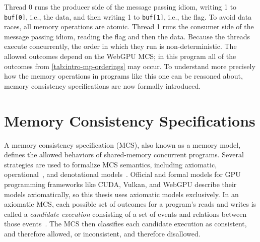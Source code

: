 Thread 0 runs the producer side of the message passing idiom, writing 1 to \texttt{buf[0]}, i.e., the data, and then writing 1 to \texttt{buf[1]}, i.e., the flag. To avoid data races, all memory operations are atomic. Thread 1 runs the consumer side of the message passing idiom, reading the flag and then the data. Because the threads execute concurrently, the order in which they run is non-deterministic. The allowed outcomes depend on the WebGPU MCS; in this program all of the outcomes from \mytab\ref{tab:intro-mp-orderings} may occur. To understand more precisely how the memory operations in programs like this one can be reasoned about, memory consistency specifications are now formally introduced.

\section{Memory Consistency Specifications}
\label{sec:bg-mcs}

A memory consistency specification (MCS), also known as a memory model, defines the allowed behaviors of shared-memory concurrent programs. Several strategies are used to formalize MCS semantics, including axiomatic, operational~\cite{colvin2018highleveloperationalsemanticshardware,nienhuis2016operational}, and denotational models~\cite{kavanagh2018denotationalaccountc11stylememory}. Official and formal models for GPU programming frameworks like CUDA, Vulkan, and WebGPU describe their models axiomatically, so this thesis uses axiomatic models exclusively. In an axiomatic MCS, each possible set of outcomes for a program's reads and writes is called a \textit{candidate execution} consisting of a set of events and relations between those events~\cite{alglave2014herding,batty2011mathematizing}. The MCS then classifies each candidate execution as consistent, and therefore allowed, or inconsistent, and therefore disallowed.

